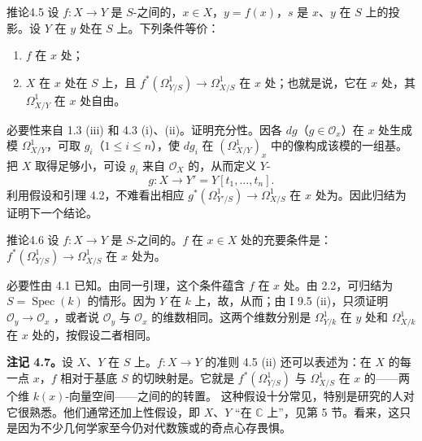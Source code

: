 \begin{SGAresult}{推论}{4.5}
设 $f:X\to Y$ 是 $S$-之间的，$x\in X$，$y=f(x)$，$s$ 是 $x$、$y$ 在 $S$ 上的投影。设 $Y$ 在 $y$ 处在 $S$ 上。下列条件等价：
\begin{enumerate}
\item[(i)] $f$ 在 $x$ 处；
\item[(ii)] $X$ 在 $x$ 处在 $S$ 上，且 $f^*(\Omega^1_{Y/S})\to\Omega^1_{X/S}$ 在 $x$ 处；也就是说，它在 $x$ 处，其 $\Omega^1_{X/Y}$ 在 $x$ 处自由。
\end{enumerate}
\end{SGAresult}
必要性来自 1.3 (iii) 和 4.3 (i)、(ii)。证明充分性。因各 $dg$（$g\in\mathcal O_x$）在 $x$ 处生成模 $\Omega^1_{X/Y}$，可取 $g_i$（$1\leq i\leq n$），使 $dg_i$ 在 $(\Omega^1_{X/Y})_x$ 中的像构成该模的一组基。把 $X$ 取得足够小，可设 $g_i$ 来自 $\mathcal O_X$ 的，从而定义 $Y$-
\[
g:X\longrightarrow Y'=Y[t_1,\ldots,t_n].
\]
利用假设和引理 4.2，不难看出相应 $g^*(\Omega^1_{Y'/S})\to\Omega^1_{X/S}$ 在 $x$ 处为。因此归结为证明下一个结论。

\begin{SGAresult}{推论}{4.6}
设 $f:X\to Y$ 是 $S$-之间的。$f$ 在 $x\in X$ 处的充要条件是： $f^*(\Omega^1_{Y/S})\to\Omega^1_{X/S}$ 在 $x$ 处为。
\end{SGAresult}
必要性由 4.1 已知。由同一引理，这个条件蕴含 $f$ 在 $x$ 处。由 2.2，可归结为 $S=\operatorname{Spec}(k)$ 的情形。因为 $Y$ 在 $k$ 上，故，从而；由 I 9.5 (ii)，只须证明 $\mathcal O_y\to\mathcal O_x$ ，或者说 $\mathcal O_y$ 与 $\mathcal O_x$ 的维数相同。这两个维数分别是 $\Omega^1_{Y/k}$ 在 $y$ 处和 $\Omega^1_{X/k}$ 在 $x$ 处的，按假设二者相同。

\textbf{注记 4.7。}设 $X$、$Y$ 在 $S$ 上。$f:X\to Y$ 的准则 4.5 (ii) 还可以表述为：在 $X$ 的每一点 $x$，$f$ 相对于基底 $S$ 的切映射是。它就是 $f^*(\Omega^1_{Y/S})$ 与 $\Omega^1_{X/S}$ 在 $x$ 的——两个维 $k(x)$-向量空间——之间的的转置。
这种假设十分常见，特别是研究的人对它很熟悉。他们通常还加上性假设，即 $X$、$Y$ “在 $\mathbb C$ 上”，见第 5 节。看来，这只是因为不少几何学家至今仍对代数簇或的奇点心存畏惧。

